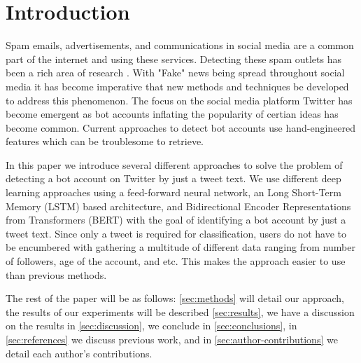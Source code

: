 \section{Introduction}
\label{sec:introduction}

Spam emails, advertisements, and communications in social media are a
common part of the internet and using these services. Detecting these
spam outlets has been a rich area of research
\citep{Cormack:2008:ESF:1454707.1454708,
DBLP:journals/corr/cs-CL-0009009, Androutsopoulos2006LearningTF,
Bickel:2006:DSF:2976456.2976477, Bratko:2006:SFU:1248547.1248644,
Solan:inproceedings, Cresci:2017:PSS:3041021.3055135, fameforsale2015,
INUWADUTSE2018496, FM2793, 8424744}.  With "Fake" news being spread
throughout social media \citep{NBERw25223} it has become imperative
that new methods and techniques be developed to address this
phenomenon. The focus on the social media platform Twitter has become
emergent \citep{8424744, FM2793, INUWADUTSE2018496,
Cresci:2017:PSS:3041021.3055135, fameforsale2015} as bot accounts
inflating the popularity of certian ideas has become common. Current
approaches to detect bot accounts use hand-engineered features which
can be troublesome to retrieve.

In this paper we introduce several different approaches to solve the
problem of detecting a bot account on Twitter by just a tweet text. We use
different deep learning approaches using a feed-forward neural
network, an Long Short-Term Memory (LSTM) based architecture, and
Bidirectional Encoder Representations from Transformers (BERT) with
the goal of identifying a bot account by just a tweet text. Since only a
tweet is required for classification, users do not have to be
encumbered with gathering a multitude of different data ranging from
number of followers, age of the account, and etc. This makes the
approach easier to use than previous methods.

The rest of the paper will be as follows: \cref{sec:methods} will
detail our approach, the results of our experiments will be described
\cref{sec:results}, we have a discussion on the results in \cref{sec:discussion}, we conclude in \cref{sec:conclusions}, in
\cref{sec:references} we discuss previous work, and in
\cref{sec:author-contributions} we detail each author's contributions.
